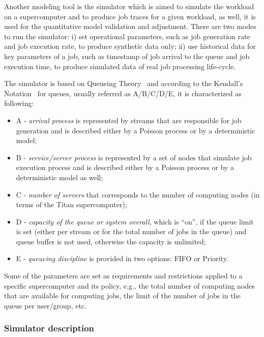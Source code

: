 Another modeling tool is the simulator which is aimed to simulate the workload
on a supercomputer and to produce job traces for a given workload, as well,
it is used for the quantitative model validation and adjustment. There are
two modes to run the simulator: i) set operational parameters, such as job
generation rate and job execution rate, to produce synthetic data only; ii)
use historical data for key parameters of a job, such as timestamp of job
arrival to the queue and job execution time, to produce simulated data of
real job processing life-cycle.

The simulator is based on Queueing Theory~\cite{ref-queueing-theory} and
according to the Kendall's Notation~\cite{ref-kendall} for queues, usually
referred as A/B/C/D/E, it is characterized as following:
\begin{itemize}
    \item A - \textit{arrival process} is represented by streams that are
    responsible for job generation and is described either by a Poisson
    process or by a deterministic model;
     \item B - \textit{service/server process} is represented by a set of
    nodes that simulate job execution process and is described either by a
    Poisson process or by a deterministic model as well;
    \item C - \textit{number of servers} that corresponds to the number of
    computing nodes (in terms of the Titan supercomputer);
    \item D - \textit{capacity of the queue or system overall}, which is
    ``on'', if the queue limit is set (either per stream or for the total
    number of jobs in the queue) and queue buffer is not used, otherwise the
    capacity is unlimited;
    \item E - \textit{queueing discipline} is provided in two options: FIFO
    or Priority.
\end{itemize}

Some of the parameters are set as requirements and restrictions applied to a
specific supercomputer and its policy, e.g., the total number of computing
nodes that are available for computing jobs, the limit of the number of jobs
in the queue per user/group, etc.

\subsubsection{Simulator description} \label{sec-strategy-2-1}


